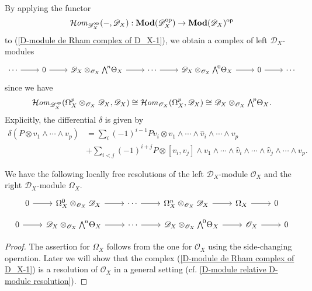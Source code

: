 By applying the functor
\[\operatorname{\mathcal{H}\hspace*{-0.4pt}\textit{om}\hspace{0.5pt}}_{\mathscr{D}_X^{\mathrm{op}}}(-,\mathscr{D}_X):\mathbf{Mod}(\mathscr{D}_X^{\mathrm{op}})\to\mathbf{Mod}(\mathscr{D}_X)^{\mathrm{op}}\]
to (\ref{D-module de Rham complex of D_X-1}), we obtain a complex of left $\mathscr{D}_X$-modules
\begin{equation}\label{D-module Spencer resolution of O_X}
\begin{tikzcd}
\cdots\ar[r]&0\ar[r]&\mathscr{D}_X\otimes_{\mathscr{O}_X}\bigw^n\Theta_X\ar[r]&\cdots\ar[r]&\mathscr{D}_X\otimes_{\mathscr{O}_X}\bigw^0\Theta_X\ar[r]&0\ar[r]&\cdots
\end{tikzcd}
\end{equation}
since we have 
\[\sHom_{\mathscr{D}_X^{\op}}(\Omega_X^p\otimes_{\mathscr{O}_X}\mathscr{D}_X,\mathscr{D}_X)\cong\sHom_{\mathscr{O}_X}(\Omega_X^p,\mathscr{D}_X)\cong\mathscr{D}_X\otimes_{\mathscr{O}_X}\bigw^p\Theta_X.\]
Explicitly, the differential $\delta$ is given by
\begin{align*}
\delta(P\otimes v_1\wedge\cdots\wedge v_p)&=\sum_i(-1)^{i-1}Pv_i\otimes v_1\wedge\cdots\wedge\hat{v}_i\wedge\cdots\wedge v_p\\
&+\sum_{i<j}(-1)^{i+j}P\otimes[v_i,v_j]\wedge v_1\wedge\cdots\wedge\hat{v}_i\wedge\cdots\wedge\hat{v}_j\wedge\cdots\wedge v_p.
\end{align*}

\begin{proposition}\label{D-module resolution of Omega_X and O_X}
We have the following locally free resolutions of the left $\mathscr{D}_X$-module $\mathscr{O}_X$ and the right $\mathscr{D}_X$-module $\Omega_X$.
\begin{equation}
\begin{tikzcd}
0\ar[r]&\Omega_X^0\otimes_{\mathscr{O}_X}\mathscr{D}_X\ar[r]&\cdots\ar[r]&\Omega_X^n\otimes_{\mathscr{O}_X}\mathscr{D}_X\ar[r]&\Omega_X\ar[r]&0
\end{tikzcd}
\end{equation}
\vspace*{-4mm}
\begin{equation}
\begin{tikzcd}
0\ar[r]&\mathscr{D}_X\otimes_{\mathscr{O}_X}\bigw^n\Theta_X\ar[r]&\cdots\ar[r]&\mathscr{D}_X\otimes_{\mathscr{O}_X}\bigw^0\Theta_X\ar[r]&\mathscr{O}_X\ar[r]&0
\end{tikzcd}
\end{equation}
\end{proposition}
\begin{proof}
The assertion for $\Omega_X$ follows from the one for $\mathscr{O}_X$ using the side-changing operation. Later we will show that the complex (\ref{D-module de Rham complex of D_X-1}) is a resolution of $\mathscr{O}_X$ in a general setting (cf. \cref{D-module relative D-module resolution}).
\end{proof}

